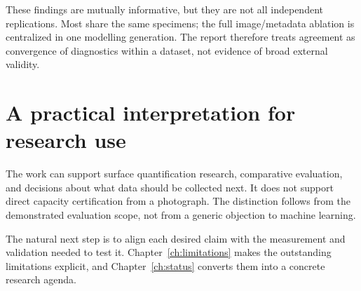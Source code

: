 These findings are mutually informative, but they are not all independent replications. Most share the same specimens; the full image/metadata ablation is centralized in one modelling generation. The report therefore treats agreement as convergence of diagnostics within a dataset, not evidence of broad external validity.

\section{A practical interpretation for research use}
The work can support surface quantification research, comparative evaluation, and decisions about what data should be collected next. It does not support direct capacity certification from a photograph. The distinction follows from the demonstrated evaluation scope, not from a generic objection to machine learning.

The natural next step is to align each desired claim with the measurement and validation needed to test it. Chapter~\ref{ch:limitations} makes the outstanding limitations explicit, and Chapter~\ref{ch:status} converts them into a concrete research agenda.
